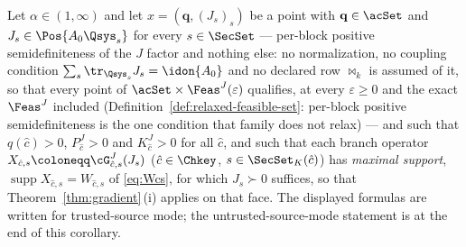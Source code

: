 \begin{corollary}\label{cor:full-gradient}
Let $\alpha\in(1,\infty)$ and let $x=(\mathbf q,(J_s)_s)$ be a point with
$\mathbf q\in\acSet$ and $J_s\in\Pos{A_0\Qsys_s}$ for every
$s\in\SecSet$ --- per-block positive semidefiniteness of the $J$ factor
and nothing else: no normalization, no coupling condition
$\sum_s\tr_{\Qsys_s}J_s=\idon{A_0}$ and no declared row $\bowtie_k$ is
assumed of it, so that every point of $\acSet\times\Feas^{J}(\varepsilon)$
qualifies, at every $\varepsilon\ge0$ and the exact $\Feas^{J}$ included
(Definition~\ref{def:relaxed-feasible-set}: per-block positive
semidefiniteness is the one condition that family does not relax) ---
and such that $q(\hat c)>0$, $P^{J}_{\hat c}>0$ and $K^{J}_{\hat c}>0$
for all $\hat c$, and such that each branch operator
$X_{\hat c,s}\coloneqq\cG^{J}_{\hat c,s}(J_s)$
($\hat c\in\Chkey$, $s\in\SecSet_K(\hat c)$) has \emph{maximal support},
$\operatorname{supp}X_{\hat c,s}=W_{\hat c,s}$ of \eqref{eq:Wcs}, for
which $J_s\succ0$ suffices, so that Theorem~\ref{thm:gradient}\,(i)
applies on that face. The displayed formulas are written for
trusted-source mode; the untrusted-source-mode statement is at the end of
this corollary.


\end{corollary}
